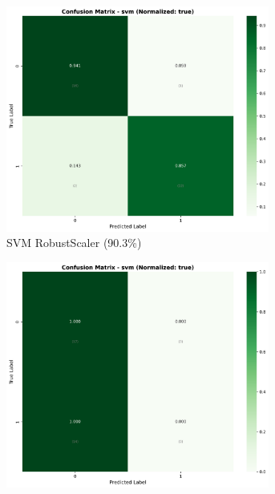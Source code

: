 \begin{figure}[H]
\centering
\begin{subfigure}[b]{0.31\textwidth}
\centering
\includegraphics[width=0.95\textwidth]{Result/cleveland_dataset/confusion_matrices/svm_numeric_dataset_RobustScaler.png}
\caption{SVM RobustScaler (90.3\%)}
\label{fig:svm_robust_optimal}
\end{subfigure}
\hfill
\begin{subfigure}[b]{0.31\textwidth}
\centering
\includegraphics[width=0.95\textwidth]{Result/cleveland_dataset/confusion_matrices/svm_numeric_dataset_MinMaxScaler.png}

\end{subfigure}
\end{figure}
